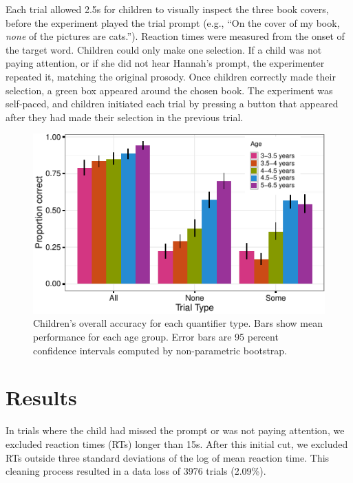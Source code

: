 \documentclass[10pt, letterpaper]{article}
\newenvironment{CodeChunk}{}{}
\begin{document}
Each trial allowed 2.5s for children to visually inspect the three book
covers, before the experiment played the trial prompt (e.g., ``On the
cover of my book, \emph{none} of the pictures are cats.''). Reaction
times were measured from the onset of the target word. Children could
only make one selection. If a child was not paying attention, or if she
did not hear Hannah's prompt, the experimenter repeated it, matching the
original prosody. Once children correctly made their selection, a green
box appeared around the chosen book. The experiment was self-paced, and
children initiated each trial by pressing a button that appeared after
they had made their selection in the previous trial.

\begin{CodeChunk}
\begin{figure}[t]
\includegraphics{figs/overall_acc-1} \caption[Children's overall accuracy for each quantifier type]{Children's overall accuracy for each quantifier type. Bars show mean performance for each age group. Error bars are 95 percent confidence intervals computed by non-parametric bootstrap.}\label{fig:overall_acc}
\end{figure}
\end{CodeChunk}

\section{Results}\label{results}

In trials where the child had missed the prompt or was not paying
attention, we excluded reaction times (RTs) longer than 15s. After this
initial cut, we excluded RTs outside three standard deviations of the
log of mean reaction time. This cleaning process resulted in a data loss
of 3976 trials (2.09\%).
\end{document}
